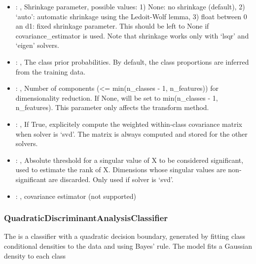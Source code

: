 \begin{itemize}
    \item {}: , 
      Shrinkage parameter, possible values: 1) None: no shrinkage (default),
      2) `auto': automatic shrinkage using the Ledoit-Wolf lemma,
      3) float between 0 an d1: fixed shrinkage parameter.
      This should be left to None if covariance\_estimator is used. Note that shrinkage works
      only with `lsqr' and `eigen' solvers.

    \item {}: , 
      The class prior probabilities. By default, the class proportions are inferred from the
      training data.

    \item {}: , 
      Number of components (<= min(n\_classes - 1, n\_features)) for dimensionality reduction.
      If None, will be set to min(n\_classes - 1, n\_features). This parameter only affects the
      transform                                                  method.

    \item {}: , 
      If True, explicitely compute the weighted within-class covariance matrix when solver
      is `svd'. The matrix is always computed and stored for the other solvers.

    \item {}: , 
      Absolute threshold for a singular value of X to be considered significant, used to estimate
      the rank of X.                                                  Dimensions whose singular
      values are non-significant are discarded. Only used if solver is `svd'.

    \item {}: , 
      covariance estimator (not supported)
  \end{itemize}


\subsubsection{QuadraticDiscriminantAnalysisClassifier}
  The  is a classifier with a quadratic decision
  boundary,     generated by fitting class conditional densities to the data and using Bayes' rule.
  The model fits a Gaussian density to each class

